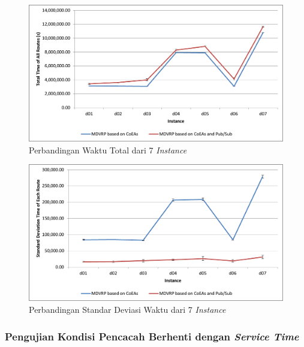 \begin{figure}[H]
	\centering
	\includegraphics[width=\textwidth]{Resources/Images/test_result_delay_total_time}
	\caption{Perbandingan Waktu Total dari 7 \textit{Instance}}
	\label{fig:test_result_delay_total_time}
\end{figure}


\begin{figure}[H]
	\centering
	\includegraphics[width=\textwidth]{Resources/Images/test_result_delay_standard_deviation}
	\caption{Perbandingan Standar Deviasi Waktu dari 7 \textit{Instance}}
	\label{fig:test_result_delay_standard_deviation}
\end{figure}


\subsubsection{Pengujian Kondisi Pencacah Berhenti dengan \textit{Service Time}}
\label{sssec:test-quit-service-time}



